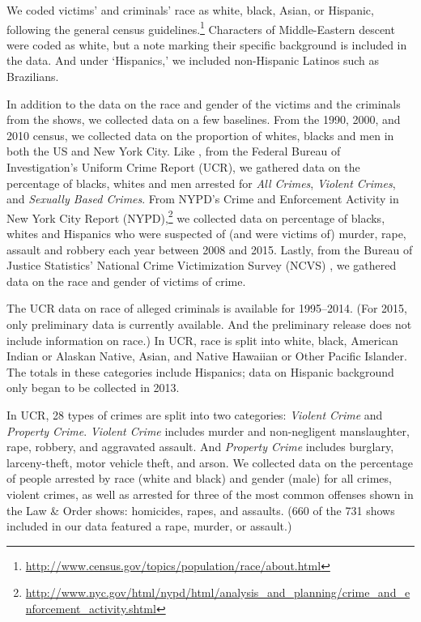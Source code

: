 \documentclass[12pt, letterpaper]{article}
\begin{document}
We coded victims' and criminals' race as white, black, Asian, or Hispanic, following the general census guidelines.\footnote{\url{http://www.census.gov/topics/population/race/about.html}} Characters of Middle-Eastern descent were coded as white, but a note marking their specific background is included in the data. And under `Hispanics,' we included non-Hispanic Latinos such as Brazilians.

In addition to the data on the race and gender of the victims and the criminals from the shows, we collected data on a few baselines. From the 1990, 2000, and 2010 census, we collected data on the proportion of whites, blacks and men in both the US and New York City. Like \citet{dixon2000overrepresentation}, from the Federal Bureau of Investigation's Uniform Crime Report (UCR), we gathered data on the percentage of blacks, whites and men arrested for \textit{All Crimes}, \textit{Violent Crimes}, and \textit{Sexually Based Crimes}. From NYPD's Crime and Enforcement Activity in New York City Report (NYPD),\footnote{\url{http://www.nyc.gov/html/nypd/html/analysis_and_planning/crime_and_enforcement_activity.shtml}} we collected data on percentage of blacks, whites and Hispanics who were suspected of (and were victims of) murder, rape, assault and robbery each year between 2008 and 2015. Lastly, from the Bureau of Justice Statistics' National Crime Victimization Survey (NCVS) \citep{powers2016national, victimization1998national}, we gathered data on the race and gender of victims of crime.  

The UCR data on race of alleged criminals is available for 1995--2014. (For 2015, only preliminary data is currently available. And the preliminary release does not include information on race.) In UCR, race is split into white, black, American Indian or Alaskan Native, Asian, and Native Hawaiian or Other Pacific Islander. The totals in these categories include Hispanics; data on Hispanic background only began to be collected in 2013. 

In UCR, 28 types of crimes are split into two categories: \textit{Violent Crime} and \textit{Property Crime}. \textit{Violent Crime} includes murder and non-negligent manslaughter, rape, robbery, and aggravated assault. And \textit{Property Crime} includes burglary, larceny-theft, motor vehicle theft, and arson. We collected data on the percentage of people arrested by race (white and black) and gender (male) for all crimes, violent crimes, as well as arrested for three of the most common offenses shown in the Law \& Order shows: homicides, rapes, and assaults. (660 of the 731 shows included in our data featured a rape, murder, or assault.)
\end{document}
